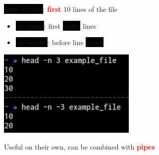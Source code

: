 \documentclass[unknownkeysallowed, 10pt, a4 paper, handout]{beamer}
\newcommand{\focus}[1]{\textbf{\textcolor{red}{#1}}}
\newcommand{\code}[1]{\colorbox{black}{\color{green}\texttt{#1}}}
\newcommand{\sidebyside}[5]{
  \begin{minipage}{#1\textwidth}
    #2
  \end{minipage} #3 \begin{minipage}{#4\textwidth}
    #5
  \end{minipage}
}
\begin{document}
\begin{frame}
\begin{center}
    \sidebyside{0.53}{
      \code{head <file>}: \focus{first} 10 lines of the file
      \vspace{-4mm}
        \begin{itemize}
          \item \code{-n <num>}: first \code{<num>} lines
          \item \code{-n -<num>}: before line \code{<num>}
        \end{itemize}
      }{\hfill}{0.44}{
        \begin{center}
          \includegraphics[width=0.50\textwidth]{pics/head.png}
        \end{center}
      }

      \vspace{4mm}

      Useful on their own, can be combined with \focus{pipes}
  \end{center}
\end{frame}
\end{document}
